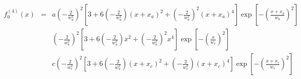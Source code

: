 \documentclass[11pt]{article}
\begin{document}
\begin{eqnarray*}
f^{(4)}_0(x) & = & a\left(-\frac{2}{w_a^2}\right)^2\left[3 + 6\left(-\frac{2}{w_a^2}\right)(x + x_a)^2 + \left(-\frac{2}{w_a^2}\right)^2(x + x_a)^4\right]\exp\left[-\left(\frac{x + x_a}{w_a}\right)^2\right] \\[1em]
& & \left(-\frac{2}{w_b^2}\right)^2\left[3 + 6\left(-\frac{2}{w_b^2}\right)x^2 + \left(-\frac{2}{w_b^2}\right)^2x^4\right]\exp\left[-\left(\frac{x}{w_c}\right)^2\right] \\[1em]
& & c\left(-\frac{2}{w_c^2}\right)^2\left[3 + 6\left(-\frac{2}{w_a^2}\right)(x + x_c)^2 + \left(-\frac{2}{w_c^2}\right)(x + x_c)^4\right]\exp\left[-\left(\frac{x + x_c}{w_c}\right)^2\right]
\end{eqnarray*}
\end{document}
